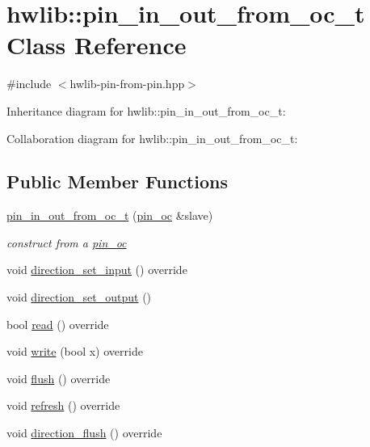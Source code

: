 \hypertarget{classhwlib_1_1pin__in__out__from__oc__t}{}\section{hwlib\+:\+:pin\+\_\+in\+\_\+out\+\_\+from\+\_\+oc\+\_\+t Class Reference}
\label{classhwlib_1_1pin__in__out__from__oc__t}


{\ttfamily \#include $<$hwlib-\/pin-\/from-\/pin.\+hpp$>$}



Inheritance diagram for hwlib\+:\+:pin\+\_\+in\+\_\+out\+\_\+from\+\_\+oc\+\_\+t\+:


Collaboration diagram for hwlib\+:\+:pin\+\_\+in\+\_\+out\+\_\+from\+\_\+oc\+\_\+t\+:
\subsection*{Public Member Functions}
\begin{DoxyCompactItemize}
\item 
\mbox{\label{classhwlib_1_1pin__in__out__from__oc__t_a84d48e384bdd929b0be9a6840fd3cbe5}} 
\hyperlink{classhwlib_1_1pin__in__out__from__oc__t_a84d48e384bdd929b0be9a6840fd3cbe5}{pin\+\_\+in\+\_\+out\+\_\+from\+\_\+oc\+\_\+t} (\hyperlink{classhwlib_1_1pin__oc}{pin\+\_\+oc} \&slave)
\begin{DoxyCompactList}\small\item\em construct from a \hyperlink{classhwlib_1_1pin__oc}{pin\+\_\+oc} \end{DoxyCompactList}\item 
void \hyperlink{classhwlib_1_1pin__in__out__from__oc__t_afb5147f7a8a702c839d0d55b7b3f245d}{direction\+\_\+set\+\_\+input} () override
\item 
void \hyperlink{classhwlib_1_1pin__in__out__from__oc__t_a792d6b72134b11f0e9ffe9989b8287e6}{direction\+\_\+set\+\_\+output} ()
\item 
bool \hyperlink{classhwlib_1_1pin__in__out__from__oc__t_ae9345a726556cf5ac138f575df044722}{read} () override
\item 
void \hyperlink{classhwlib_1_1pin__in__out__from__oc__t_aeba3375851126ed813762bc16fee057c}{write} (bool x) override
\item 
void \hyperlink{classhwlib_1_1pin__in__out__from__oc__t_a69c975d51ed408a8abb62924c59e9cdb}{flush} () override
\item 
void \hyperlink{classhwlib_1_1pin__in__out__from__oc__t_a2662b0d953b8af04f5bb7994cd2787e5}{refresh} () override
\item 
void \hyperlink{classhwlib_1_1pin__in__out__from__oc__t_a906190c8ee6e6846235a33d98a258eb1}{direction\+\_\+flush} () override
\end{DoxyCompactItemize}


